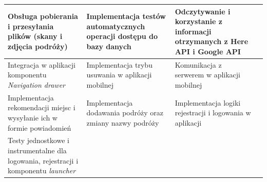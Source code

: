 \documentclass[10pt,twoside,a4paper]{report}
\begin{document}
\begin{longtable}{ |p{3.3cm}|p{3.3cm}|p{3.3cm}|p{3.3cm}| }
\hline
Obsługa pobierania i przesyłania plików (skany i zdjęcia podróży)
& Implementacja testów automatycznych operacji dostępu do bazy danych
& Odczytywanie i korzystanie z informacji otrzymanych z Here API i Google API
& \\

\hline
Integracja w aplikacji komponentu \textit{Navigation drawer }
& Implementacja trybu usuwania w aplikacji mobilnej
& Komunikacja z serwerem w aplikacji mobilnej
& \\

\hline
Implementacja rekomendacji miejsc i wysyłanie ich w formie powiadomień
& Implementacja dodawania podróży oraz zmiany nazwy podróży
& Implementacja logiki rejestracji i logowania w aplikacji
& \\

\hline
Testy jednostkowe i instrumentalne dla logowania, rejestracji i komponentu \textit{launcher}
& 
& 
& \\

\hline
\end{longtable}
\end{document}
